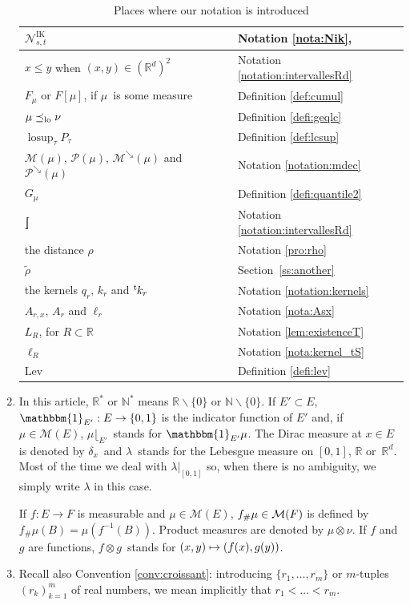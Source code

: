\documentclass[JEP,XML,SOM,Unicode,NoEqCountersInSection,NoFloatCountersInSection,published]{cedram}
\newcommand\mto{\mathchoice{\longmapsto}{\mapsto}{\mapsto}{\mapsto}}
\theoremstyle{plain}
\theoremstyle{definition}
\newcommand{\lev}{\mathrm{Lev}}
\newcommand{\IT}{\mathrm{IK}}
\newcommand{\one}{\mathbbm{1}}
\let\mb\relax
\let\mn\relax
\newcommand{\trans}{{}^{\mathrm{t}}\mkern-1mu}
\newcommand{\la}{\lambda}
\newcommand{\p}{\mathcal{P}}
\newcommand{\m}{\mathcal{M}}
\newcommand{\R}{\mathbb{R}}
\newcommand{\N}{\mathbb{N}}
\newcommand{\lcsup}{\operatorname{losup}}
\newcommand{\pdec}{\mathcal{P}^{\scriptscriptstyle\searrow}}
\newcommand{\mdec}{\mathcal{M}^{\scriptscriptstyle\searrow}}
\newcommand{\leqlc}{\preceq_{\rm lo}}
\begin{document}
\begin{enumerate}
\begin{table}[htb]
\begin{tabular}{|p{}|l|}
$\mathcal{N}^\IT_{s,t}$ & Notation \ref{nota:Nik},\\\hline
$x\leq y$ when \mn $(x,y)\in(\R^d)^2$\mb & Notation \ref{notation:intervallesRd}\\\hline
$F_\mu$ or $F[\mu]$, if \mn$\mu$\mb\ is some measure & Definition \ref{def:cumul}\\\hline
$\mu\leqlc\nu$ & Definition \ref{defi:geqlc}\\\hline
$\lcsup_\tau P_\tau$ & Definition \ref{def:lcsup}\\\hline
$\m(\mu)$, $\p(\mu)$, $\mdec(\mu)$ and $\pdec(\mu)$ & Notation \ref{notation:mdec}\\\hline
$G_\mu$ & Definition \ref{defi:quantile2}\\\hline
$\mathclose{\rfloor\hspace*{-1.1ex}\lceil}$ & Notation \ref{notation:intervallesRd}\\\hline
the distance $\rho$ & Notation \ref{pro:rho}\\\hline
$\tilde \rho$ & Section~\ref{ss:another}\\\hline
the kernels $q_r,\, k_r$ and $\trans k_r$ & Notation \ref{notation:kernels}\\\hline
$A_{r,x}$, $A_{r}$ and $\ell_r$ & Notation \ref{nota:Asx}\\\hline
$L_R$, for \mn$R\subset\R$\mb & Notation \ref{lem:existenceT}\\\hline
$\ell_R$ & Notation \ref{nota:kernel_tS}\\\hline
$\lev$ & Definition \ref{defi:lev}\\\hline
\end{tabular}\hspace*{\fill}\normalsize
\mn
\vspace*{.5\baselineskip}
\caption{\label{table:notation}Places where our notation is introduced}
\end{table}

\item
In this article, $\R^\ast$ or $\N^\ast$ means $\R\smallsetminus\{0\}$ or $\N\smallsetminus\{0\}$. If $E'\subset E$, $\mbox{\mb$\one_{E'}$\mn}:E\to\{0,1\}$ is the indicator function of $E'$ and, if $\mu\in\m(E)$, \mb$\mu\lfloor_{E'}$\mn\ stands for $\one_{E'}\mu$. The Dirac measure at $x\in E$ is denoted by \mb$\delta_x$\mn\ and \mb$\la$\mn\ stands for the Lebesgue measure on $[0,1]$, $\R$ or~$\R^d$. Most of the time we deal with $\la|_{[0,1]}$ so, when there is no ambiguity, we simply write $\la$ in this case.

If $f:E\to F$ is measurable and $\mu\in\m(E)$, ${\text{\mb$f_\#\mu$\mn}}\in\m(F)$ is defined by $f_\#\mu(B)=\mu(f^{-1}(B))$. Product measures are denoted by \mb$\mu\otimes \nu$\mn. If $f$ and $g$ are functions, \mb$f\otimes g$\mn\ stands for $(x,y)\mto(f(x),g(y))$.

\item
Recall also Convention \ref{conv:croissant}: introducing $\{r_1,\ldots,r_m\}$ or $m$-tuples $(r_k)^m_{k=1}$ of real numbers, we mean implicitly that $r_1<\ldots<r_m$.
\end{enumerate}
\end{document}
